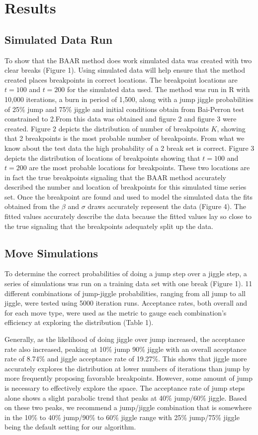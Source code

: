 \documentclass[submit]{smj}
\begin{document}
\section{Results}

\subsection{Simulated Data Run}
To show that the BAAR method does work simulated data was created with two clear breaks (Figure 1). Using simulated data will help ensure that the method created places breakpoints in correct locations. The breakpoint locations are $t =100$ and $t=200$ for the simulated data used. The method was run in R with 10,000 iterations, a burn in period of 1,500, along with a jump jiggle probabilities of 25\% jump and 75\% jiggle and initial conditions obtain from Bai-Perron test constrained to 2.From this data was obtained and figure 2 and figure 3 were created. Figure 2 depicts the distribution of number of breakpoints $K$, showing that 2 breakpoints is the most probable number of breakpoints. From what we know about the test data the high probability of a 2 break set is correct. Figure 3 depicts the distribution of locations of breakpoints showing that $t=100$ and $t=200$ are the most probable locations for breakpoints. These two locations are in fact the true breakpoints signaling that the BAAR method accurately described the number and location of breakpoints for this simulated time series set. Once the breakpoint are found and used to model the simulated data the fits obtained from the $\beta$ and $\sigma$ draws accurately represent the data (Figure 4). The fitted values accurately describe the data because the fitted values lay so close to the true signaling that the breakpoints adequately split up the data.    

\subsection{Move Simulations}
To determine the correct probabilities of doing a jump step over a jiggle step, a series of simulations was run on a training data set with one break (Figure 1). 11 different combinations of jump-jiggle probabilities, ranging from all jump to all jiggle, were tested using 5000 iteration runs. Acceptance rates, both overall and for each move type, were used as the metric to gauge each combination's efficiency at exploring the distribution (Table 1).

Generally, as the likelihood of doing jiggle over jump increased, the acceptance rate also increased, peaking at 10\% jump 90\% jiggle with an overall acceptance rate of 8.74\% and jiggle acceptance rate of 19.27\%. This shows that jiggle more accurately explores the distribution at lower numbers of iterations than jump by more frequently proposing favorable breakpoints. However, some amount of jump is necessary to effectively explore the space. The acceptance rate of jump steps alone shows a slight parabolic trend that peaks at 40\% jump/60\% jiggle. Based on these two peaks, we recommend a jump/jiggle combination that is somewhere in the 10\% to 40\% jump/90\% to 60\% jiggle range with 25\% jump/75\% jiggle being the default setting for our algorithm.
\end{document}
